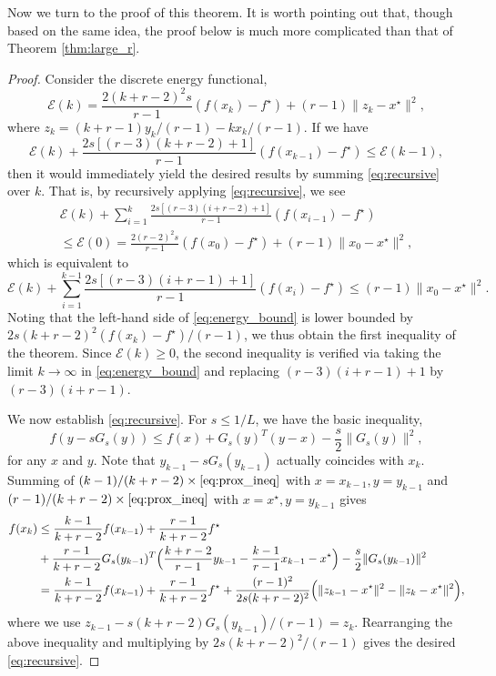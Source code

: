 \documentclass[twoside,11pt]{article}
\newcommand{\goto}{\rightarrow}
\begin{document}
Now we turn to the proof of this theorem. It is worth pointing out that, though based on the same idea, the proof below is much more complicated than that of Theorem \ref{thm:large_r}. 
\begin{proof}
Consider the discrete energy functional,
\begin{equation}\nonumber
\mathcal{E}(k) = \frac{2(k+r-2)^2s}{r-1}(f(x_k)-f^\star) + (r-1)\|z_k - x^\star\|^2,
\end{equation}
where $z_k = (k+r-1)y_k/(r-1) - kx_k/(r-1)$.
If we have
\begin{equation}\label{eq:recursive}
\mathcal{E}(k) + \frac{2s[(r-3)(k+r-2)+1]}{r-1}(f(x_{k-1})-f^\star) \le \mathcal{E}(k-1),
\end{equation}
then it would immediately yield the desired results by summing \eqref{eq:recursive} over $k$. That is, by recursively applying \eqref{eq:recursive}, we see
\begin{multline}\nonumber
\mathcal{E}(k) + \sum_{i=1}^k\frac{2s[(r-3)(i+r-2)+1]}{r-1}(f(x_{i-1})-f^\star) \\
\le \mathcal{E}(0) = \frac{2(r-2)^2s}{r-1}(f(x_0)-f^\star) + (r-1)\|x_0 - x^\star\|^2, 
\end{multline}
which is equivalent to
\begin{equation}\label{eq:energy_bound}
\mathcal{E}(k) + \sum_{i=1}^{k-1}\frac{2s[(r-3)(i+r-1)+1]}{r-1}(f(x_{i})-f^\star) \le (r-1)\|x_0 - x^\star\|^2.
\end{equation}
Noting that the left-hand side of \eqref{eq:energy_bound} is lower bounded by $2s(k+r-2)^2(f(x_k)-f^\star)/(r-1)$, we thus obtain the first inequality of the theorem. Since $\mathcal{E}(k)\geq 0$, the second inequality is verified via taking the limit $k\goto\infty$ in \eqref{eq:energy_bound} and replacing $(r-3)(i+r-1)+1$ by $(r-3)(i+r-1)$.

We now establish \eqref{eq:recursive}. For $s\le 1/L$, we have the basic inequality,
\begin{equation}\label{eq:prox_ineq}
f(y-sG_s(y)) \le f(x) + G_s(y)^T(y-x) - \frac{s}{2}\|G_s(y)\|^2,
\end{equation}
for any $x$ and $y$. Note that $y_{k-1}-sG_s(y_{k-1})$ actually coincides with $x_k$. Summing of $(k-1)/(k+r-2)\times\eqref{eq:prox_ineq}$ with $x=x_{k-1}, y = y_{k-1}$ and $(r-1)/(k+r-2)\times\eqref{eq:prox_ineq}$ with $x=x^\star, y=y_{k-1}$ gives
\begin{equation}\nonumber
\begin{aligned}
f(x_k) &\le \frac{k-1}{k+r-2}f(x_{k-1}) + \frac{r-1}{k+r-2}f^\star\\
& + \frac{r-1}{k+r-2}G_s(y_{k-1})^T\Big{(}\frac{k+r-2}{r-1}y_{k-1}-\frac{k-1}{r-1}x_{k-1} - x^\star\Big{)} - \frac{s}{2}\|G_s(y_{k-1})\|^2\\
&= \frac{k-1}{k+r-2}f(x_{k-1}) + \frac{r-1}{k+r-2}f^\star + \frac{(r-1)^2}{2s(k+r-2)^2}\Big{(}\|z_{k-1}-x^\star\|^2 - \|z_{k}-x^\star\|^2\Big{)}, \\
\end{aligned}
\end{equation}
where we use $z_{k-1}-s(k+r-2)G_s(y_{k-1})/(r-1)=z_{k}$. Rearranging the above inequality and multiplying by $2s(k+r-2)^2/(r-1)$ gives the desired \eqref{eq:recursive}.


\end{proof}
\end{document}
